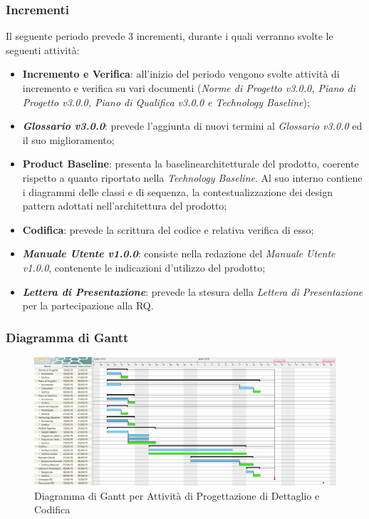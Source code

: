 \subsubsection{Incrementi}
Il seguente periodo prevede 3 incrementi, durante i quali verranno svolte le seguenti attività:
\begin{itemize}
	\item \textbf{Incremento e Verifica}: all'inizio del periodo vengono svolte attività di incremento e verifica su vari documenti (\textit{Norme di Progetto v3.0.0, Piano di Progetto v3.0.0, Piano di Qualifica v3.0.0 e Technology Baseline});
	\item \textbf{\textit{Glossario v3.0.0}}: prevede l'aggiunta di nuovi termini al \textit{Glossario v3.0.0} ed il suo miglioramento;
	\item \textbf{Product Baseline}\glossario: presenta la baseline\glossario architetturale del prodotto, coerente rispetto a quanto riportato nella \textit{Technology Baseline}. Al suo interno contiene i diagrammi delle classi e di sequenza, la contestualizzazione dei design pattern adottati nell'architettura del prodotto; 
	\item \textbf{Codifica}: prevede la scrittura del codice e relativa verifica di esso;
	\item \textbf{\textit{Manuale Utente v1.0.0}}: consiste nella redazione del \textit{Manuale Utente v1.0.0}, contenente le indicazioni d'utilizzo del prodotto;
	\item \textbf{\textit{Lettera di Presentazione}}: prevede la stesura della \textit{Lettera di Presentazione} per la partecipazione alla RQ.
\end{itemize}


\begin{landscape}
\subsubsection{Diagramma di Gantt}
\begin{figure}[h]
	\centering
  		\includegraphics[width=1.0\linewidth]{./images/DettaglioeCodifica.png}
  		\caption{Diagramma di Gantt per Attività di Progettazione di Dettaglio e Codifica}
  		\label{fig:Gantt Progettazione di dettaglio e codifica}
\end{figure}
\end{landscape}

